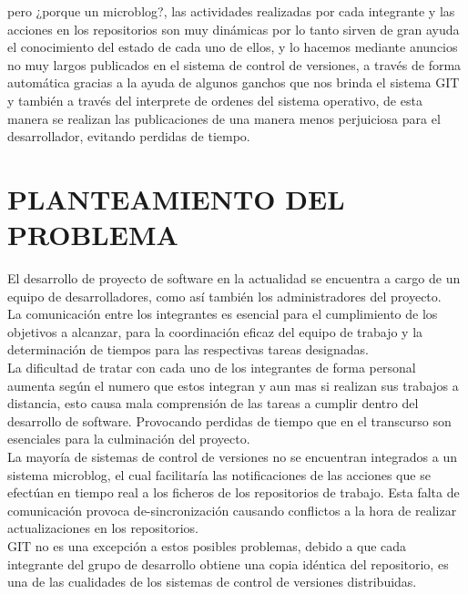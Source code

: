 pero ¿porque un microblog?, las actividades realizadas por cada integrante y las acciones en los repositorios son muy dinámicas por lo tanto sirven de gran ayuda el conocimiento del estado de cada uno de ellos, y lo hacemos mediante anuncios no muy largos publicados en el sistema de control de versiones, a través de forma automática gracias a la ayuda de algunos ganchos que nos brinda el sistema GIT y también a través del interprete de ordenes del sistema operativo, de esta manera se realizan las publicaciones de una manera menos perjuiciosa para el desarrollador, evitando perdidas de tiempo.\\

\section{PLANTEAMIENTO DEL PROBLEMA}
El desarrollo de proyecto de software en la actualidad se encuentra a cargo de un equipo de desarrolladores, como así también los administradores del proyecto.\\

La comunicación entre los integrantes es esencial para el cumplimiento de los objetivos a alcanzar, para la coordinación eficaz del equipo de trabajo y la determinación de tiempos para las respectivas tareas designadas.\\

La dificultad de tratar con cada uno de los integrantes de forma personal aumenta según el numero que estos integran y aun mas si realizan sus trabajos a distancia, esto causa mala comprensión de las tareas a cumplir dentro del desarrollo de software. Provocando perdidas de tiempo que en el transcurso son esenciales para la culminación del proyecto.\\

La mayoría de sistemas de control de versiones no se encuentran integrados a un sistema microblog, el cual facilitaría las notificaciones de las acciones que se efectúan en tiempo real a los ficheros de los repositorios de trabajo. Esta falta de comunicación provoca de-sincronización causando conflictos a la hora de realizar actualizaciones en los repositorios.\\

GIT no es una excepción a estos posibles problemas, debido a que cada integrante del grupo de desarrollo obtiene una copia idéntica del repositorio, es una de las cualidades de los sistemas de control de versiones distribuidas.\\

